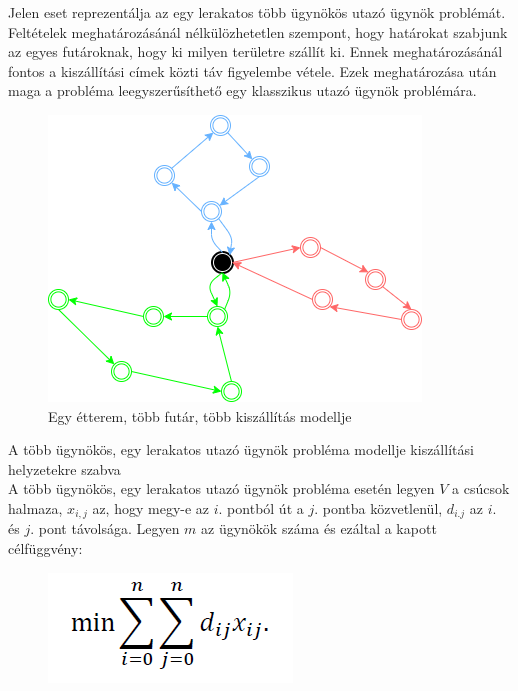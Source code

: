 

Jelen eset reprezentálja az egy lerakatos több ügynökös utazó ügynök problémát. Feltételek meghatározásánál nélkülözhetetlen szempont, hogy határokat szabjunk az egyes futároknak, hogy ki milyen területre szállít ki. Ennek meghatározásánál fontos a kiszállítási címek közti táv figyelembe vétele. Ezek meghatározása után maga a probléma leegyszerűsíthető egy klasszikus utazó ügynök problémára.

\begin{figure}[h!]
\centering
\includegraphics[scale=0.7]{images/Onedepotmtsp.png}
\caption{Egy étterem, több futár, több kiszállítás modellje}
\label{fig:model4}
\end{figure}


A több ügynökös, egy lerakatos utazó ügynök probléma modellje kiszállítási helyzetekre szabva\\

A több ügynökös, egy lerakatos utazó ügynök probléma esetén legyen $V$ a csúcsok halmaza, $x_{i,j}$ az, hogy megy-e az $i.$ pontból út a $j.$ pontba közvetlenül, $d_{i.j}$ az $i.$ és $j.$ pont távolsága. Legyen $m$ az ügynökök száma és ezáltal a kapott célfüggvény:

\begin{figure}[h!]
\centering
\includegraphics[scale=0.5]{images/mtsp1.png}
\end{figure}

